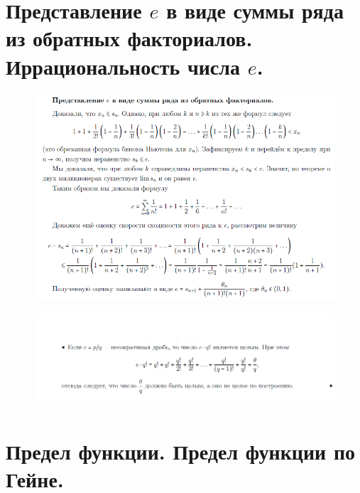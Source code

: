 \section{Представление $e$ в виде суммы ряда из обратных факториалов. Иррациональность числа $e$.}

 \begin{figure}[h!]
\centering
\includegraphics[scale=0.7]{Pictures/21_1.PNG}
\end{figure}
 \begin{figure}[h!]
\centering
\includegraphics[scale=0.7]{Pictures/21_2.PNG}
\end{figure}
\newpage

\section{Предел функции. Предел функции по Гейне.}


